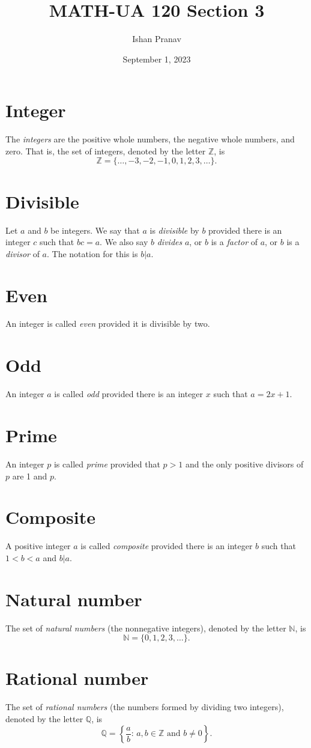 \documentclass[12pt]{article}
\title{MATH-UA 120 Section 3}
\author{Ishan Pranav}
\date{September 1, 2023}
\begin{document}
\maketitle
\section*{Integer}
The \textit{integers} are the positive whole numbers, the negative whole numbers, and zero. That is, the set of integers, denoted by the letter $\mathbb{Z}$, is
\[\mathbb{Z}=\{\dots,-3,-2,-1,0,1,2,3,\dots\}.\]
\section*{Divisible}
Let $a$ and $b$ be integers. We say that $a$ is \textit{divisible} by $b$ provided there is an integer $c$ such that $bc=a$. We also say $b$ \textit{divides} $a$, or $b$ is a \textit{factor} of $a$, or $b$ is a \textit{divisor} of $a$. The notation for this is $b|a$.
\section*{Even}
An integer is called \textit{even} provided it is divisible by two.
\section*{Odd}
An integer $a$ is called \textit{odd} provided there is an integer $x$ such that $a=2x+1$.
\section*{Prime}
An integer $p$ is called \textit{prime} provided that $p>1$ and the only positive divisors of $p$ are 1 and $p$.
\section*{Composite}
A positive integer $a$ is called \textit{composite} provided there is an integer $b$ such that $1<b<a$ and $b|a$.
\section*{Natural number}
The set of \textit{natural numbers} (the nonnegative integers), denoted by the letter $\mathbb{N}$, is 
\[\mathbb{N}=\{0,1,2,3,\dots\}.\]
\section*{Rational number}
The set of \textit{rational numbers} (the numbers formed by dividing two integers), denoted by the letter $\mathbb{Q}$, is
\[\mathbb{Q}=\left\{\frac{a}{b}:\,a,b\in\mathbb{Z}\text{ and }b\neq 0\right\}.\]
\end{document}
